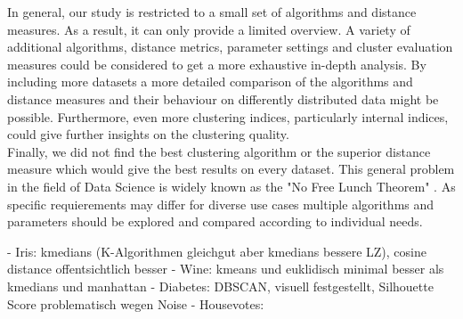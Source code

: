 In general, our study is restricted to a small set of algorithms and distance measures. As a result, it can only provide a limited overview. A variety of additional algorithms, distance metrics, parameter settings and cluster evaluation measures could be considered to get a more exhaustive in-depth analysis. By including more datasets a more detailed comparison of the algorithms and distance measures and their behaviour on differently distributed data might be possible. Furthermore, even more clustering indices, particularly internal indices, could give further insights on the clustering quality. \\

Finally, we did not find the best clustering algorithm or the superior distance measure which would give the best results on every dataset. This general problem in the field of Data Science is widely known as the "No Free Lunch Theorem" \cite{nofreelunch}. As specific requierements may differ for diverse use cases multiple algorithms and parameters should be explored and compared according to individual needs. 

- Iris: kmedians (K-Algorithmen gleichgut aber kmedians bessere LZ), cosine distance offentsichtlich besser
- Wine: kmeans und euklidisch minimal besser als kmedians und manhattan
- Diabetes: DBSCAN, visuell festgestellt, Silhouette Score problematisch wegen Noise  
- Housevotes: 